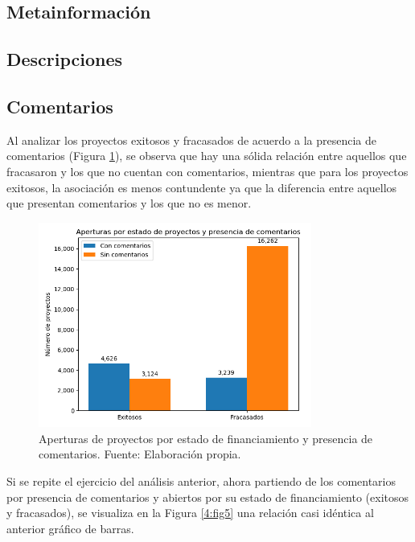\subsection{Metainformación}

\subsection{Descripciones}

\subsection{Comentarios}
Al analizar los proyectos exitosos y fracasados de acuerdo a la presencia de comentarios (Figura \ref{4:fig4}), se observa que hay una sólida relación entre aquellos que fracasaron y los que no cuentan con comentarios, mientras que para los proyectos exitosos, la asociación es menos contundente ya que la diferencia entre aquellos que presentan comentarios y los que no es menor.

\begin{figure}[h]
	\begin{center}
		\includegraphics[width=0.8\textwidth]{4/figures/projects state by comment.png}
		\caption{Aperturas de proyectos por estado de financiamiento y presencia de comentarios. Fuente: Elaboración propia.}
		\label{4:fig4}
	\end{center}
\end{figure}

Si se repite el ejercicio del análisis anterior, ahora partiendo de los comentarios por presencia de comentarios y abiertos por su estado de financiamiento (exitosos y fracasados), se visualiza en la Figura \ref{4:fig5} una relación casi idéntica al anterior gráfico de barras.

